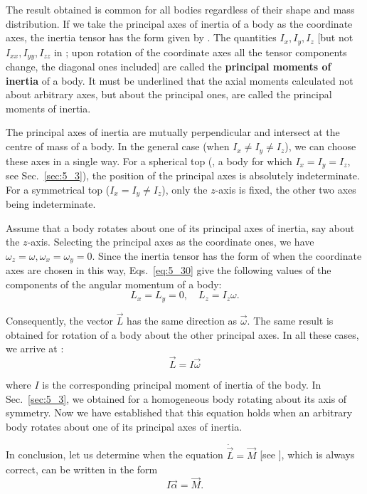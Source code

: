 The result obtained is common for all bodies regardless of their shape and mass distribution. If we take the principal axes of inertia of a body as the coordinate axes, the inertia tensor has the form given by . The quantities $I_x, I_y, I_z$ [but not $I_{xx}, I_{yy}, I_{zz}$ in ; upon rotation of the coordinate axes all the tensor components change, the diagonal ones included] are called the \textbf{principal moments of inertia} of a body. It must be underlined that the axial moments calculated not about arbitrary axes, but about the principal ones, are called the principal moments of inertia.

The principal axes of inertia are mutually perpendicular and intersect at the centre of mass of a body. In the general case (when $I_x\neq I_y\neq I_z$), we can choose these axes in a single way. For a spherical top (\ie, a body for which $I_x=I_y=I_z$, see Sec.~\ref{sec:5_3}), the position of the principal axes is absolutely indeterminate. For a symmetrical top ($I_x=I_y\neq I_z$), only the $z$-axis is fixed, the other
two axes being indeterminate.

Assume that a body rotates about one of its principal axes of inertia, say about the $z$-axis. Selecting the principal axes as the coordinate ones, we have $\omega_z=\omega, \omega_x=\omega_y=0$. Since the inertia tensor has the form of  when the coordinate axes are chosen in this way, Eqs.~\eqref{eq:5_30} give the following values of the components of the angular momentum of a body:
\begin{equation*}
L_x = L_y = 0,\quad L_z=I_z\omega.
\end{equation*}

\noindent
Consequently, the vector $\vec{L}$ has the same direction as $\vec{\omega}$. The same result is obtained for rotation of a body about the other principal axes. In all these cases, we arrive at :
\begin{equation*}
\vec{L} = I\vec{\omega}
\end{equation*}

\noindent
where $I$ is the corresponding principal moment of inertia of the body. In Sec.~\ref{sec:5_3}, we obtained  for a homogeneous body rotating about its axis of symmetry. Now we have established that this equation holds when an arbitrary body rotates about one of its principal axes of inertia.

In conclusion, let us determine when the equation $\dot{\vec{L}}=\vec{M}$ [see ], which is always correct, can be written in the form
\begin{equation}\label{eq:5_44}
I \vec{\alpha} = \vec{M}.
\end{equation}

